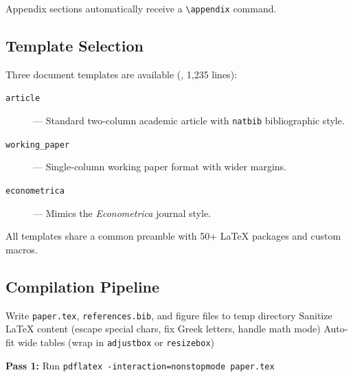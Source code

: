 Appendix sections automatically receive a \texttt{\textbackslash appendix} command.

\subsection{Template Selection}

Three document templates are available (, 1,235 lines):

\begin{description}
  \item[\texttt{article}] --- Standard two-column academic article with \texttt{natbib} bibliographic style.
  \item[\texttt{working\_paper}] --- Single-column working paper format with wider margins.
  \item[\texttt{econometrica}] --- Mimics the \emph{Econometrica} journal style.
\end{description}

All templates share a common preamble with 50+ \LaTeX{} packages and custom macros.

\subsection{Compilation Pipeline}

\begin{algorithm}[H]
\caption{\LaTeX{} Compilation Pipeline}
\label{alg:latex-compilation}
\SetAlgoLined
{}

Write \texttt{paper.tex}, \texttt{references.bib}, and figure files to temp directory\;
Sanitize \LaTeX{} content (escape special chars, fix Greek letters, handle math mode)\;
Auto-fit wide tables (wrap in \texttt{adjustbox} or \texttt{resizebox})\;

\textbf{Pass 1:} Run \texttt{pdflatex -interaction=nonstopmode paper.tex}\;


\;
\end{algorithm}


